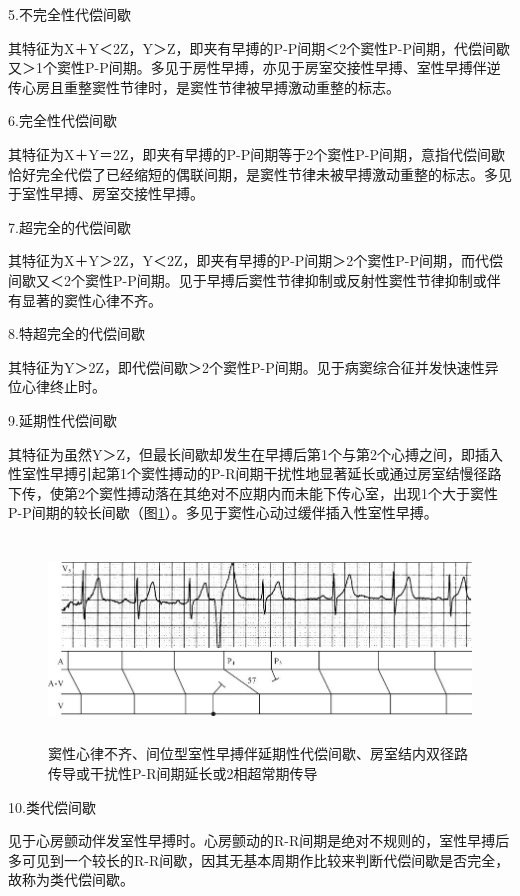 5.不完全性代偿间歇

其特征为X＋Y＜2Z，Y＞Z，即夹有早搏的P-P间期＜2个窦性P-P间期，代偿间歇又＞1个窦性P-P间期。多见于房性早搏，亦见于房室交接性早搏、室性早搏伴逆传心房且重整窦性节律时，是窦性节律被早搏激动重整的标志。

6.完全性代偿间歇

其特征为X＋Y＝2Z，即夹有早搏的P-P间期等于2个窦性P-P间期，意指代偿间歇恰好完全代偿了已经缩短的偶联间期，是窦性节律未被早搏激动重整的标志。多见于室性早搏、房室交接性早搏。

7.超完全的代偿间歇

其特征为X＋Y＞2Z，Y＜2Z，即夹有早搏的P-P间期＞2个窦性P-P间期，而代偿间歇又＜2个窦性P-P间期。见于早搏后窦性节律抑制或反射性窦性节律抑制或伴有显著的窦性心律不齐。

8.特超完全的代偿间歇

其特征为Y＞2Z，即代偿间歇＞2个窦性P-P间期。见于病窦综合征并发快速性异位心律终止时。

9.延期性代偿间歇

其特征为虽然Y＞Z，但最长间歇却发生在早搏后第1个与第2个心搏之间，即插入性室性早搏引起第1个窦性搏动的P-R间期干扰性地显著延长或通过房室结慢径路下传，使第2个窦性搏动落在其绝对不应期内而未能下传心室，出现1个大于窦性P-P间期的较长间歇（图\ref{fig11-1}）。多见于窦性心动过缓伴插入性室性早搏。

\begin{figure}[!htbp]
 \centering
 \includegraphics[width=5.78125in,height=2.11458in]{./images/Image00153.jpg}
 \captionsetup{justification=centering}
 \caption{窦性心律不齐、间位型室性早搏伴延期性代偿间歇、房室结内双径路传导或干扰性P-R间期延长或2相超常期传导}
 \label{fig11-1}
  \end{figure} 

10.类代偿间歇

见于心房颤动伴发室性早搏时。心房颤动的R-R间期是绝对不规则的，室性早搏后多可见到一个较长的R-R间歇，因其无基本周期作比较来判断代偿间歇是否完全，故称为类代偿间歇。


